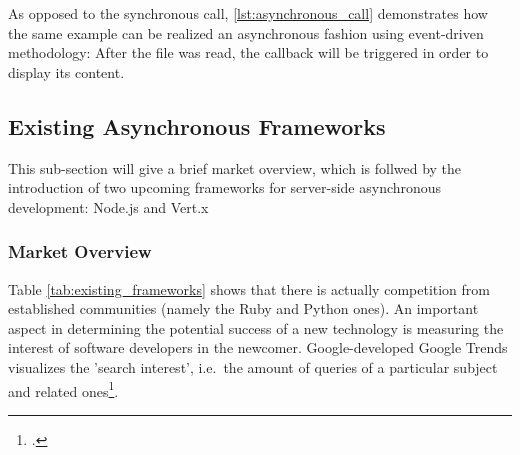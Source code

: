 

As opposed to the synchronous call, \ref{lst:asynchronous_call} demonstrates how the same example can be realized an asynchronous fashion using event-driven methodology: After the file was read, the callback will be triggered in order to display its content.






\subsection{Existing Asynchronous Frameworks}
\label{existing_frameworks}
This sub-section will give a brief market overview, which is follwed by the introduction of two upcoming frameworks for server-side asynchronous development: Node.js and Vert.x


\subsubsection{Market Overview}
\label{frameworks_overview}
\FloatBarrier
Table \ref{tab:existing_frameworks} shows that there is actually competition from established communities (namely the Ruby and Python ones). An important aspect in determining the potential success of a new technology is measuring the interest of software developers in the newcomer. Google-developed Google Trends visualizes the 'search interest', i.e.\ the amount of queries of a particular subject and related ones\footcite[Cf.][]{g_trends}.


